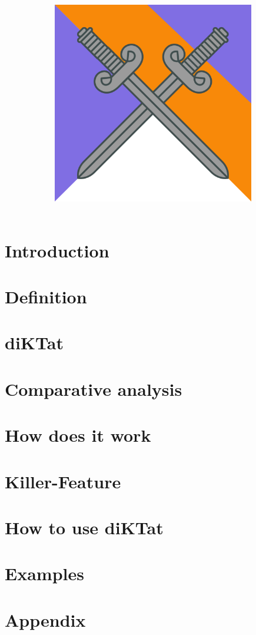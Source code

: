 \documentclass{article}
\title{
  \includegraphics[height=250pt]{wp/pictures/logo.png}\\
  }
\begin{document}
\author{}
\maketitle
\pagebreak
\renewcommand{\cftsecleader}{\cftdotfill{\cftdotsep}}
\tableofcontents
\pagebreak

\section{Introduction}
\label{sec:intro}


\section{Definition}
\label{sec:definition}


\section{diKTat}
\label{sec:diKTat}


\section{Comparative analysis}
\label{sec:compare}


\section{How does it work}
\label{sec:work}


\section{Killer-Feature}
\label{sec:feature}


\section{How to use diKTat}
\label{sec:download}


\section{Examples}
\label{sec:examples}


\section{Appendix}
\label{sec:appendix}

\end{document}
